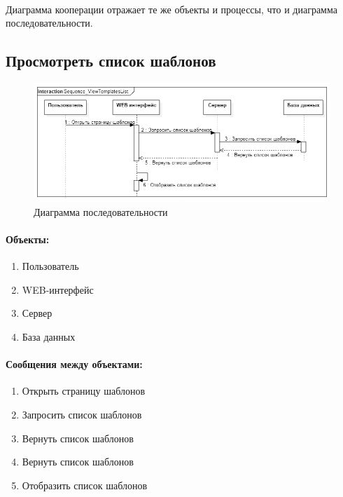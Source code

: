 \documentclass{article}
\begin{document}
        \paragraph{}
        Диаграмма кооперации отражает те же объекты и процессы, что и диаграмма
        последовательности.
    
    
    \subsection{Просмотреть список шаблонов}
        \begin{figure}[H]
            \includegraphics[width=\textwidth, center]
                {Sequence_ViewTemplatesList}
            \caption{Диаграмма последовательности}
        \end{figure}
        \paragraph{Объекты:}
        \begin{enumerate}
            \item Пользователь
            \item WEB-интерфейс
            \item Сервер
            \item База данных
        \end{enumerate}
        \paragraph{Сообщения между объектами:}
        \begin{enumerate}
            \item Открыть страницу шаблонов
            \item Запросить список шаблонов
            \item Вернуть список шаблонов
            \item Вернуть список шаблонов
            \item Отобразить список шаблонов
        \end{enumerate}
\end{document}
